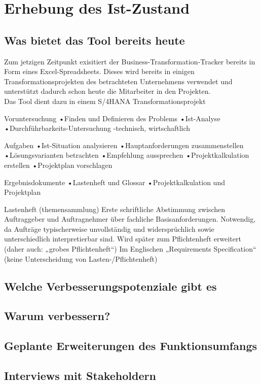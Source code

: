 \section{Erhebung des Ist-Zustand}

\subsection{Was bietet das Tool bereits heute}
Zum jetzigen Zeitpunkt exisitiert der Business-Transformation-Tracker bereits in Form eines Excel-Spreadsheets. Dieses wird bereits in einigen Transformationsprojekten des betrachteten Unternehmens verwendet und unterstützt dadurch schon heute die Mitarbeiter in den Projekten. \\Das Tool dient dazu in einem S/4HANA Transformationsprojekt 

Voruntersuchung
•Finden und Definieren des Problems
•Ist-Analyse
•Durchführbarkeits-Untersuchung
-technisch, wirtschaftlich

Aufgaben
•Ist-Situation analysieren
•Hauptanforderungen zusammenstellen
•Lösungsvarianten betrachten
•Empfehlung aussprechen
•Projektkalkulation erstellen
•Projektplan vorschlagen

Ergebnisdokumente
•Lastenheft und Glossar
•Projektkalkulation und Projektplan

Lastenheft (themensammlung)
Erste schriftliche Abstimmung zwischen Auftraggeber und Auftragnehmer über fachliche Basisanforderungen.
Notwendig, da Aufträge typischerweise unvollständig und widersprüchlich sowie unterschiedlich interpretierbar sind.
Wird später zum Pflichtenheft erweitert (daher auch: „grobes Pflichtenheft“)
Im Englischen „Requirements Specification“ (keine Unterscheidung von Lasten-/Pflichtenheft)

\subsection{Welche Verbesserungspotenziale gibt es}

\subsection{Warum verbessern?}

\subsection{Geplante Erweiterungen des Funktionsumfangs}

\subsection{Interviews mit Stakeholdern}